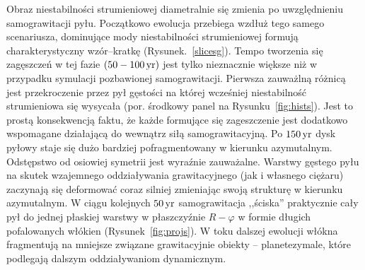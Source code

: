 %
\par Obraz niestabilności strumieniowej diametralnie się zmienia po
uwzględnieniu samograwitacji pyłu. Początkowo ewolucja przebiega wzdłuż tego
samego scenariusza, dominujące mody niestabilności strumieniowej formują
charakterystyczny wzór--kratkę (Rysunek.~\ref{slicesg}). Tempo tworzenia się
zagęszczeń w tej fazie $(50 - 100\hbox{$\thinspace\textrm{yr}$})$ jest tylko nieznacznie większe niż w
przypadku symulacji pozbawionej samograwitacji. Pierwsza zauważlną różnicą jest
przekroczenie przez pył gęstości na której wcześniej niestabilność strumieniowa
się wysycała (por. środkowy panel na Rysunku~\ref{fig:hists}). Jest to prostą
konsekwencją faktu, że każde formujące się zageszczenie jest dodatkowo
wspomagane działającą do wewnątrz siłą samograwitacyjną. Po $150\hbox{$\thinspace\textrm{yr}$}$ dysk pyłowy
staje się dużo bardziej pofragmentowany w kierunku azymutalnym. Odstępstwo od
osiowiej symetrii jest wyraźnie zauważalne. Warstwy gęstego pyłu na skutek
wzajemnego oddziaływania grawitacyjnego (jak i własnego ciężaru) zaczynają się
deformować coraz silniej zmieniając swoją strukturę w kierunku azymutalnym. W
ciągu kolejnych $50\hbox{$\thinspace\textrm{yr}$}$ samograwitacja ,,ściska'' praktycznie cały pył do jednej
płaskiej warstwy w płaszczyźnie $R - \varphi$ w formie długich pofalowanych
włókien (Rysunek~\ref{fig:projs}). W toku dalszej ewolucji włókna fragmentują na
mniejsze związane grawitacyjnie obiekty -- planetezymale, które podlegają
dalszym oddziaływaniom dynamicznym. 
%
